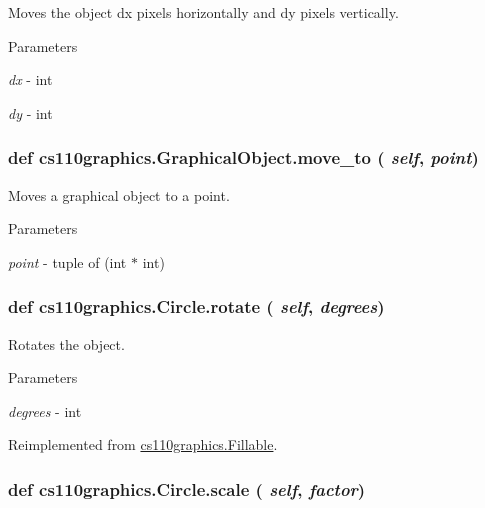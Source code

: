 Moves the object dx pixels horizontally and dy pixels vertically. 
\begin{DoxyParams}{Parameters}
\item[{\em dx}]-\/ int \item[{\em dy}]-\/ int \end{DoxyParams}
\hypertarget{classcs110graphics_1_1GraphicalObject_abe2d480265df7ac9447205c52c6946df}{
\subsubsection[{move\_\-to}]{\setlength{\rightskip}{0pt plus 5cm}def cs110graphics.GraphicalObject.move\_\-to ( {\em self}, \/   {\em point})}}
\label{classcs110graphics_1_1GraphicalObject_abe2d480265df7ac9447205c52c6946df}


Moves a graphical object to a point. 
\begin{DoxyParams}{Parameters}
\item[{\em point}]-\/ tuple of (int $\ast$ int) \end{DoxyParams}
\hypertarget{classcs110graphics_1_1Circle_a0532651c10c084766ac3032c57107eb0}{
\subsubsection[{rotate}]{\setlength{\rightskip}{0pt plus 5cm}def cs110graphics.Circle.rotate ( {\em self}, \/   {\em degrees})}}
\label{classcs110graphics_1_1Circle_a0532651c10c084766ac3032c57107eb0}


Rotates the object. 
\begin{DoxyParams}{Parameters}
\item[{\em degrees}]-\/ int \end{DoxyParams}


Reimplemented from \hyperlink{classcs110graphics_1_1Fillable_afa6710f6c314de39d19f06d9dd306d7d}{cs110graphics.Fillable}.\hypertarget{classcs110graphics_1_1Circle_a9ffed9eb3f191fafadd5b2d7e7735c18}{
\subsubsection[{scale}]{\setlength{\rightskip}{0pt plus 5cm}def cs110graphics.Circle.scale ( {\em self}, \/   {\em factor})}}
\label{classcs110graphics_1_1Circle_a9ffed9eb3f191fafadd5b2d7e7735c18}



